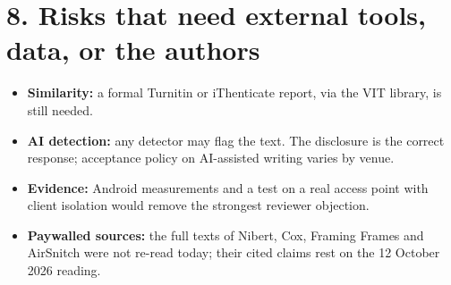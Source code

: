 \documentclass[10pt,a4paper]{article}
\begin{document}
\section*{8. Risks that need external tools, data, or the authors}
\begin{itemize}
\item \textbf{Similarity:} a formal Turnitin or iThenticate report, via the VIT library, is still needed.
\item \textbf{AI detection:} any detector may flag the text. The disclosure is the correct response; acceptance policy on AI-assisted writing varies by venue.
\item \textbf{Evidence:} Android measurements and a test on a real access point with client isolation would remove the strongest reviewer objection.
\item \textbf{Paywalled sources:} the full texts of Nibert, Cox, Framing Frames and AirSnitch were not re-read today; their cited claims rest on the 12 October 2026 reading.
\end{itemize}
\end{document}
